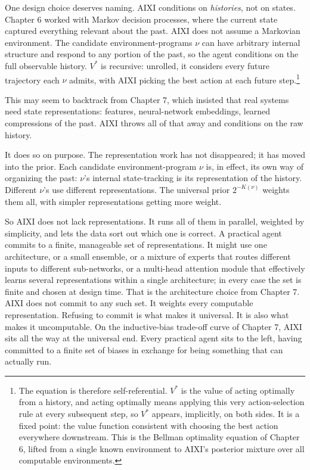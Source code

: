 One design choice deserves naming. AIXI conditions on \emph{histories}, not on states. Chapter 6 worked with Markov decision processes, where the current state captured everything relevant about the past. AIXI does not assume a Markovian environment. The candidate environment-programs $\nu$ can have arbitrary internal structure and respond to any portion of the past, so the agent conditions on the full observable history. $V^*$ is recursive: unrolled, it considers every future trajectory each $\nu$ admits, with AIXI picking the best action at each future step.\footnote{The equation is therefore self-referential. $V^*$ is the value of acting optimally from a history, and acting optimally means applying this very action-selection rule at every subsequent step, so $V^*$ appears, implicitly, on both sides. It is a fixed point: the value function consistent with choosing the best action everywhere downstream. This is the Bellman optimality equation of Chapter 6, lifted from a single known environment to AIXI's posterior mixture over all computable environments.}

This may seem to backtrack from Chapter 7, which insisted that real systems need state representations: features, neural-network embeddings, learned compressions of the past. AIXI throws all of that away and conditions on the raw history.

It does so on purpose. The representation work has not disappeared; it has moved into the prior. Each candidate environment-program $\nu$ is, in effect, its own way of organizing the past: $\nu$'s internal state-tracking is its representation of the history. Different $\nu$'s use different representations. The universal prior $2^{-K(\nu)}$ weights them all, with simpler representations getting more weight.

So AIXI does not lack representations. It runs all of them in parallel, weighted by simplicity, and lets the data sort out which one is correct. A practical agent commits to a finite, manageable set of representations. It might use one architecture, or a small ensemble, or a mixture of experts that routes different inputs to different sub-networks, or a multi-head attention module that effectively learns several representations within a single architecture; in every case the set is finite and chosen at design time. That is the architecture choice from Chapter 7. AIXI does not commit to any such set. It weights every computable representation. Refusing to commit is what makes it universal. It is also what makes it uncomputable. On the inductive-bias trade-off curve of Chapter 7, AIXI sits all the way at the universal end. Every practical agent sits to the left, having committed to a finite set of biases in exchange for being something that can actually run.

